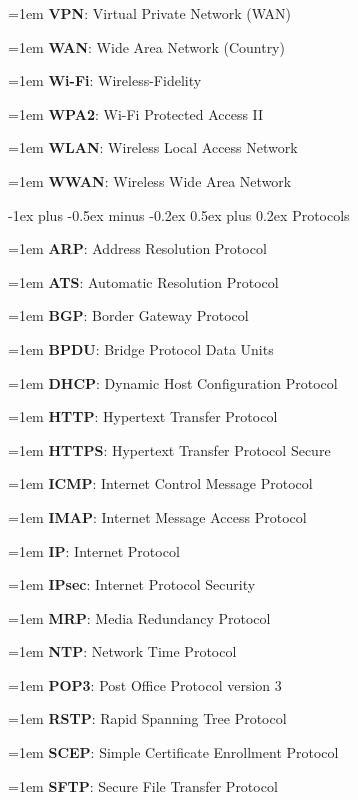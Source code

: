 \documentclass[letterpaper,8pt]{extarticle}
\makeatletter
\newcommand{\definition}[2]{
  \hangindent=1em
  \textbf{#1}: #2%
}
\renewcommand{\subsection}{\@startsection{subsection}{2}{0mm}%
  {-1ex plus -0.5ex minus -0.2ex}%
  {0.5ex plus 0.2ex}%
{\color{h2}\normalfont\fontsize{6}{6}\selectfont\bfseries}}
\makeatother
\begin{document}
\begin{multicols*}{5}
\begin{multicols*}{2}
    \definition{VPN}{Virtual Private Network (WAN)}
    
    \definition{WAN}{Wide Area Network (Country)}
    
    \definition{Wi-Fi}{Wireless-Fidelity}
    
    \definition{WPA2}{Wi-Fi Protected Access II}
    
    \definition{WLAN}{Wireless Local Access Network}
    
    \definition{WWAN}{Wireless Wide Area Network}
    
  \end{multicols*}
  
  \subsection{Protocols}
  
  \begin{multicols*}{2}
    
    \definition{ARP}{Address Resolution Protocol}
    
    \definition{ATS}{Automatic Resolution Protocol}
    
    \definition{BGP}{Border Gateway Protocol}
    
    \definition{BPDU}{Bridge Protocol Data Units}
    
    \definition{DHCP}{Dynamic Host Configuration Protocol}
    
    \definition{HTTP}{Hypertext Transfer Protocol}
    
    \definition{HTTPS}{Hypertext Transfer Protocol Secure}
    
    \definition{ICMP}{Internet Control Message Protocol}
    
    \definition{IMAP}{Internet Message Access Protocol}
    
    \definition{IP}{Internet Protocol}
    
    \definition{IPsec}{Internet Protocol Security}
    
    \definition{MRP}{Media Redundancy Protocol}
    
    \definition{NTP}{Network Time Protocol}
    
    \definition{POP3}{Post Office Protocol version 3}
    
    \definition{RSTP}{Rapid Spanning Tree Protocol}
    
    \definition{SCEP}{Simple Certificate Enrollment Protocol}
    
    \definition{SFTP}{Secure File Transfer Protocol}
    

\end{multicols*}
\end{multicols*}
\end{document}
